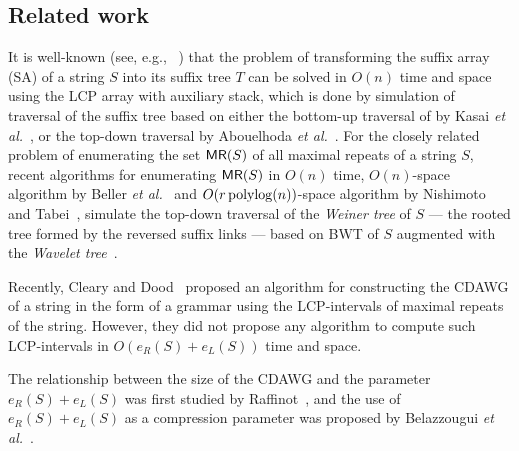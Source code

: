 \documentclass{article}
\begin{document}
\subsection{Related work}
It is well-known (see, e.g., ~\cite{crochemore2021book125problems:chap:satostree}) that the problem of transforming the suffix array (SA) of a string $S$ into its suffix tree $T$ can be solved in $O(n)$ time and space using the LCP array with auxiliary stack, which is done by simulation of traversal of the suffix tree based on either the bottom-up traversal of by Kasai \textit{et al.}~\cite{kasai:lee2001lcp:linear},
or the top-down traversal by Abouelhoda \textit{et al.}~\cite{abouelhoda2004replacing}.
For the closely related problem of enumerating the set $\textsf{MR}(S)$ of all maximal repeats of a string $S$, recent algorithms for enumerating $\textsf{MR}(S)$ in $O(n)$ time, $O(n)$-space algorithm by Beller \textit{et al.}~\cite{beller:berger2012space:efficient:bbo} and $O(r\operatorname{\mathrm{polylog}}(n))$-space algorithm by Nishimoto and Tabei~\cite{nishimoto:cpm2021enum}, simulate the top-down traversal of the \textit{Weiner tree} of $S$ --- the rooted tree formed by the reversed suffix links ---  based on BWT of $S$ augmented with the \textit{Wavelet tree}~\cite{grossi2003high}.

Recently, Cleary and Dood~\cite{cleary2023constructing} proposed an algorithm for constructing the CDAWG of a string in the form of a grammar using the LCP-intervals of maximal repeats of the string. However, they did not propose any algorithm to compute such LCP-intervals in $O(e_R(S) + e_L(S))$ time and space.

The relationship between the size of the CDAWG and the parameter ${e_R(S) + e_L(S)}$ was first studied by Raffinot~\cite{raffinot2001maximal}, and the use of ${e_R(S) + e_L(S)}$ as a compression parameter was proposed by Belazzougui \textit{et al.}~\cite{belazzougui:nunial:gagie:prezza:raffinot2015composite}.

\end{document}
